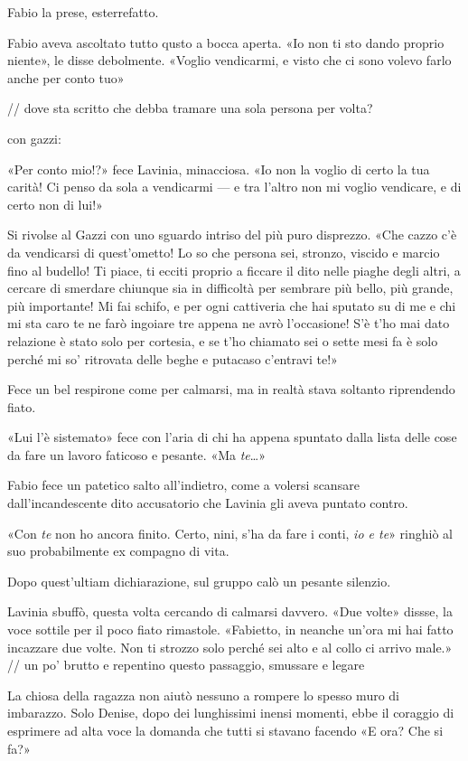 Fabio la prese, esterrefatto.

Fabio aveva ascoltato tutto qusto a bocca aperta. «Io non ti sto dando proprio niente», le disse debolmente. «Voglio vendicarmi, e visto che ci sono volevo farlo anche per conto tuo»

// dove sta scritto che debba tramare una sola persona per volta?

con gazzi:

«Per conto mio!?» fece Lavinia, minacciosa. «Io non la voglio di certo la tua carità! Ci penso da sola a vendicarmi --- e tra l'altro non mi voglio vendicare, e di certo non di lui!»

Si rivolse al Gazzi con uno sguardo intriso del più puro disprezzo. «Che cazzo c'è da vendicarsi di quest'ometto! Lo so che persona sei, stronzo, viscido e marcio fino al budello! Ti piace, ti ecciti proprio a ficcare il dito nelle piaghe degli altri, a cercare di smerdare chiunque sia in difficoltà per sembrare più bello, più grande, più importante! Mi fai schifo, e per ogni cattiveria che hai sputato su di me e chi mi sta caro te ne farò ingoiare tre appena ne avrò l'occasione! S'è t'ho mai dato relazione è stato solo per cortesia, e se t'ho chiamato sei o sette mesi fa è solo perché mi so' ritrovata delle beghe e putacaso c'entravi te!»

Fece un bel respirone come per calmarsi, ma in realtà stava soltanto riprendendo fiato.

«Lui l'è sistemato» fece con l'aria di chi ha appena spuntato dalla lista delle cose da fare un lavoro faticoso e pesante. «Ma \emph{te}\ldots»

Fabio fece un patetico salto all'indietro, come a volersi scansare dall'incandescente dito accusatorio che Lavinia gli aveva puntato contro.

«Con \emph{te} non ho ancora finito. Certo, nini, s'ha da fare i conti, \emph{io e te}» ringhiò al suo probabilmente ex compagno di vita.

Dopo quest'ultiam dichiarazione, sul gruppo calò un pesante silenzio.

Lavinia sbuffò, questa volta cercando di calmarsi davvero. «Due volte» dissse, la voce sottile per il poco fiato rimastole. «Fabietto, in neanche un'ora mi hai fatto incazzare due volte. Non ti strozzo solo perché sei alto e al collo ci arrivo male.»
// un po' brutto e repentino questo passaggio, smussare e legare

La chiosa della ragazza non aiutò nessuno a rompere lo spesso muro di imbarazzo. Solo Denise, dopo dei lunghissimi inensi momenti, ebbe il coraggio di esprimere ad alta voce la domanda che tutti si stavano facendo
«E ora? Che si fa?»

